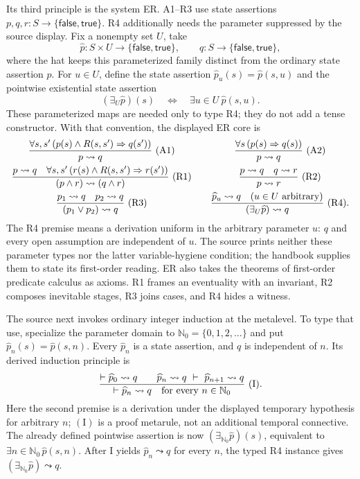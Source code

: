 Its third principle is the system ER.  A1--R3 use state assertions
\(p,q,r:S\to\{\mathsf{false},\mathsf{true}\}\).  R4 additionally needs the
parameter suppressed by the source display.  Fix a nonempty set \(U\), take
\[
 \widehat p:S\times U\to\{\mathsf{false},\mathsf{true}\},
 \qquad q:S\to\{\mathsf{false},\mathsf{true}\},
\]
where the hat keeps this parameterized family distinct from the ordinary state
assertion \(p\).  For \(u\in U\), define the state assertion
\(\widehat p_u(s)=\widehat p(s,u)\) and the pointwise existential state assertion
\[
 (\exists_U\widehat p)(s)\quad\Longleftrightarrow\quad
 \exists u\in U\ \widehat p(s,u).
\]
These parameterized maps are needed only to type R4; they do not add a tense
constructor.  With that convention, the displayed ER core is
\[
\begin{array}{c@{\qquad}c}
 \displaystyle
 \frac{\forall s,s'\,
       (p(s)\land R(s,s')\Rightarrow q(s'))}
      {p\leadsto q}\ ({\rm A1})
 &
 \displaystyle
 \frac{\forall s\,(p(s)\Rightarrow q(s))}
      {p\leadsto q}\ ({\rm A2})
 \\[2.2ex]
 \displaystyle
 \frac{p\leadsto q\quad
       \forall s,s'\,
       (r(s)\land R(s,s')\Rightarrow r(s'))}
      {(p\land r)\leadsto(q\land r)}\ ({\rm R1})
 &
 \displaystyle
 \frac{p\leadsto q\quad q\leadsto r}
      {p\leadsto r}\ ({\rm R2})
 \\[2.2ex]
 \displaystyle
 \frac{p_1\leadsto q\quad p_2\leadsto q}
      {(p_1\lor p_2)\leadsto q}\ ({\rm R3})
 &
 \displaystyle
 \frac{\widehat p_u\leadsto q\quad(u\in U\text{ arbitrary})}
      {(\exists_U\widehat p)\leadsto q}\ ({\rm R4}).
\end{array}
\]
The R4 premise means a derivation uniform in the arbitrary parameter \(u\):
\(q\) and every open assumption are independent of \(u\).  The source prints
neither these parameter types nor the latter variable-hygiene condition; the
handbook supplies them to state its first-order reading.  ER also takes the
theorems of first-order predicate calculus as axioms.  R1 frames an eventuality
with an invariant, R2 composes inevitable stages, R3 joins cases, and R4 hides
a witness.

The source next invokes ordinary integer induction at the metalevel.  To type
that use, specialize the parameter domain to
\(\mathbb N_0=\{0,1,2,\ldots\}\) and put
\(\widehat p_n(s)=\widehat p(s,n)\).  Every \(\widehat p_n\) is a state assertion,
and \(q\) is independent of \(n\).  Its derived induction principle is
\[
 \frac{
   \vdash \widehat p_0\leadsto q
   \qquad
   \widehat p_n\leadsto q\ \vdash\ \widehat p_{n+1}\leadsto q}
  {\vdash \widehat p_n\leadsto q\quad\text{for every }n\in\mathbb N_0}
  \ ({\rm I}).
\]
Here the second premise is a derivation under the displayed temporary
hypothesis for arbitrary \(n\); \((\mathrm I)\) is a proof metarule, not an
additional temporal connective.  The already defined pointwise assertion is
now \((\exists_{\mathbb N_0}\widehat p)(s)\), equivalent to
\(\exists n\in\mathbb N_0\,\widehat p(s,n)\).  After I yields
\(\widehat p_n\leadsto q\) for every \(n\), the typed R4 instance gives
\((\exists_{\mathbb N_0}\widehat p)\leadsto q\).

